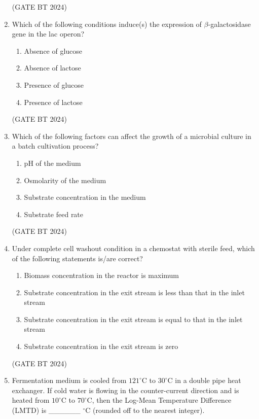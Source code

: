\documentclass[journal,12pt,onecolumn]{IEEEtran}
\theoremstyle{remark}
\begin{document}
\begin{enumerate}
\hfill (GATE BT 2024)

\item Which of the following conditions induce(s) the expression of $\beta$-galactosidase gene in the lac operon?

\begin{enumerate}
\item Absence of glucose 
\item Absence of lactose 
\item Presence of glucose 
\item Presence of lactose
\end{enumerate}

\hfill (GATE BT 2024)

\item Which of the following factors can affect the growth of a microbial culture in a batch cultivation process?

\begin{enumerate}
\item pH of the medium 
\item Osmolarity of the medium 
\item Substrate concentration in the medium 
\item Substrate feed rate
\end{enumerate}

\hfill (GATE BT 2024)

\item Under complete cell washout condition in a chemostat with sterile feed, which of the following statements is/are correct?  

\begin{enumerate}
    \item Biomass concentration in the reactor is maximum  
    \item Substrate concentration in the exit stream is less than that in the inlet stream  
    \item Substrate concentration in the exit stream is equal to that in the inlet stream  
    \item Substrate concentration in the exit stream is zero  
\end{enumerate}

\hfill (GATE BT 2024)

\item Fermentation medium is cooled from $121^\circ$C to $30^\circ$C in a double pipe heat exchanger. If cold water is flowing in the counter-current direction and is heated from $10^\circ$C to $70^\circ$C, then the Log-Mean Temperature Difference (LMTD) is \_\_\_\_\_\_ $^\circ$C (rounded off to the nearest integer).


\end{enumerate}
\end{document}
